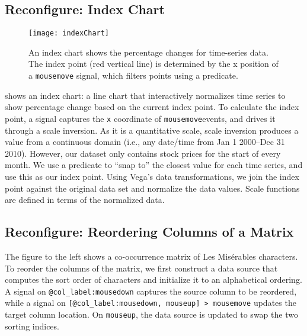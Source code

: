 \subsection{Reconfigure: Index Chart}

\vspace{-7pt}

\begin{figure}[b!]
  \centering
  \texttt{[image: indexChart]}
  \caption{An index chart shows the percentage changes for time-series data. The
  index point (red vertical line) is determined by the x position of a
  \texttt{mousemove} signal, which filters points using a predicate.}
  \label{fig:vg:indexChart}
\end{figure}

 shows an index chart: a line chart that interactively
normalizes time series to show percentage change based on the current index
point. To calculate the index point, a signal captures the \texttt{x} coordinate
of \texttt{mousemove}events, and drives it through a scale inversion. As it is a
quantitative scale, scale inversion produces a value from a continuous domain
(i.e., any date/time from Jan 1 2000--Dec 31 2010). However, our dataset only
contains stock prices for the start of every month. We use a predicate to ``snap
to'' the closest value for each time series, and use this as our index point.
Using Vega's data transformations, we join the index point against the original
data set and normalize the data values. Scale functions are defined in terms of
the normalized data.

\subsection{Reconfigure: Reordering Columns of a Matrix}


\vspace{-7pt}

The figure to the left shows a co-occurrence matrix of Les Mis\'{e}rables
characters. To reorder the columns of the matrix, we first construct a data
source that computes the sort order of characters and initialize it to an
alphabetical ordering. A signal on \texttt{@col\_label:mousedown} captures the
source column to be reordered, while a signal on \texttt{[@col\_label:mousedown,
mouseup] > mousemove} updates the target column location. On \texttt{mouseup},
the data source is updated to swap the two sorting indices.

